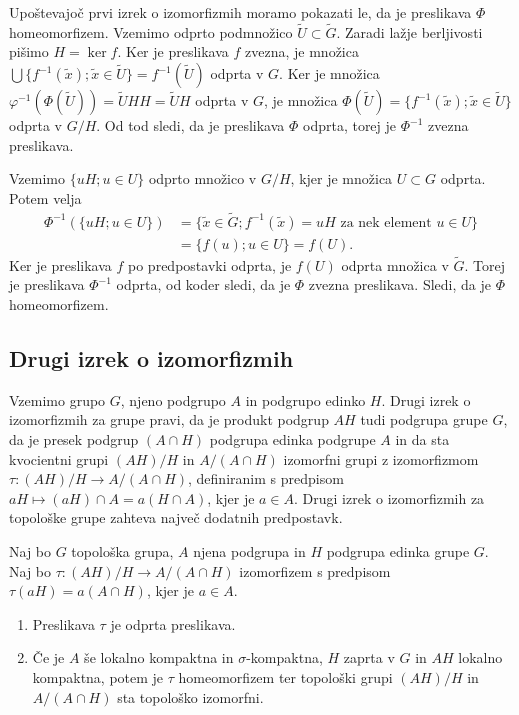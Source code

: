 \documentclass[mat1]{fmfdelo}
\begin{document}
\begin{dokaz}
Upoštevajoč prvi izrek o izomorfizmih moramo pokazati le, da je preslikava $\Phi$ homeomorfizem. Vzemimo odprto podmnožico $\widetilde{U} \subset \widetilde{G}$. Zaradi lažje berljivosti pišimo $H = \ker f$.
Ker je preslikava $f$ zvezna, je množica $\bigcup\lbrace f^{-1}(\tilde{x}) ; \tilde{x} \in \widetilde{U} \rbrace = f^{-1}(\widetilde{U})$ odprta v $G$. Ker je množica $\varphi^{-1}(\Phi(\widetilde{U})) = \widetilde{U}HH = \widetilde{U}H$ odprta v $G$, je množica $\Phi(\widetilde{U}) = \lbrace f^{-1}(\tilde{x}) ; \tilde{x} \in \widetilde{U} \rbrace$ odprta v $G/H$. Od tod sledi, da je preslikava $\Phi$ odprta, torej je $\Phi^{-1}$ zvezna preslikava.

Vzemimo $\lbrace uH ; u \in U \rbrace$ odprto množico v $G/H$, kjer je množica $U \subset G$ odprta. Potem velja
\begin{align*}
\Phi^{-1}(\lbrace uH ; u \in U \rbrace) &= \lbrace \tilde{x} \in \widetilde{G} ; f^{-1}(\tilde{x}) = uH \text{ za nek element } u \in U \rbrace \\
&= \lbrace f(u) ; u \in U \rbrace = f(U).
\end{align*}
Ker je preslikava $f$ po predpostavki odprta, je $f(U)$ odprta množica v $\widetilde{G}$. Torej je preslikava $\Phi^{-1}$ odprta, od koder sledi, da je $\Phi$ zvezna preslikava. Sledi, da je $\Phi$ homeomorfizem.
\end{dokaz}

\subsection{Drugi izrek o izomorfizmih}
Vzemimo grupo $G$, njeno podgrupo $A$ in podgrupo edinko $H$. Drugi izrek o izomorfizmih za grupe pravi, da je produkt podgrup $AH$ tudi podgrupa grupe $G$, da je presek podgrup $(A \cap H)$ podgrupa edinka podgrupe $A$ in da sta kvocientni grupi $(AH)/H$ in $A/(A \cap H)$ izomorfni grupi z izomorfizmom $\tau\colon (AH)/H \to A/(A \cap H)$, definiranim s predpisom $aH \mapsto (aH)\cap A = a(H \cap A)$, kjer je $a \in A$. Drugi izrek o izomorfizmih za topološke grupe zahteva največ dodatnih predpostavk.
\begin{izrek}\label{izr:drugitopizrek}
Naj bo $G$ topološka grupa, $A$ njena podgrupa in $H$ podgrupa edinka grupe $G$. Naj bo $\tau\colon (AH)/H \to A/(A \cap H)$ izomorfizem s predpisom $\tau (aH) = a(A \cap H)$, kjer je $a \in A$.
\begin{enumerate}
\item Preslikava $\tau$ je odprta preslikava. \label{podtrd:ioi2-1}
\item Če je $A$ še lokalno kompaktna in $\sigma$-kompaktna, $H$ zaprta v $G$ in $AH$ lokalno kompaktna, potem je $\tau$ homeomorfizem ter topološki grupi $(AH)/H$ in $A/(A \cap H)$ sta topološko izomorfni. \label{podtrd:ioi2-2}
\end{enumerate}
\end{izrek}
\end{document}
